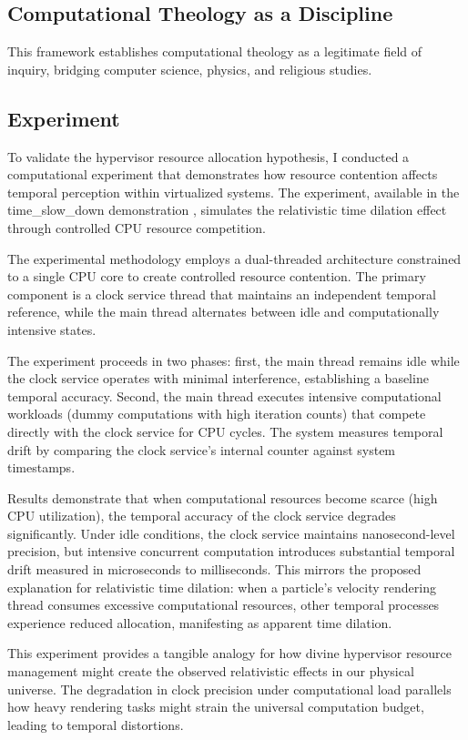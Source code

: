 \documentclass[12pt,a4paper]{article}
\begin{document}
\subsection{Computational Theology as a Discipline}

This framework establishes computational theology as a legitimate field of inquiry, bridging computer science, physics, and religious studies.

\subsection{Experiment}

To validate the hypervisor resource allocation hypothesis, I conducted a computational experiment that demonstrates how resource contention affects temporal perception within virtualized systems. The experiment, available in the time\_slow\_down demonstration \cite{time_slow_demo}, simulates the relativistic time dilation effect through controlled CPU resource competition.

The experimental methodology employs a dual-threaded architecture constrained to a single CPU core to create controlled resource contention. The primary component is a clock service thread that maintains an independent temporal reference, while the main thread alternates between idle and computationally intensive states.

The experiment proceeds in two phases: first, the main thread remains idle while the clock service operates with minimal interference, establishing a baseline temporal accuracy. Second, the main thread executes intensive computational workloads (dummy computations with high iteration counts) that compete directly with the clock service for CPU cycles. The system measures temporal drift by comparing the clock service's internal counter against system timestamps.

Results demonstrate that when computational resources become scarce (high CPU utilization), the temporal accuracy of the clock service degrades significantly. Under idle conditions, the clock service maintains nanosecond-level precision, but intensive concurrent computation introduces substantial temporal drift measured in microseconds to milliseconds. This mirrors the proposed explanation for relativistic time dilation: when a particle's velocity rendering thread consumes excessive computational resources, other temporal processes experience reduced allocation, manifesting as apparent time dilation.

This experiment provides a tangible analogy for how divine hypervisor resource management might create the observed relativistic effects in our physical universe. The degradation in clock precision under computational load parallels how heavy rendering tasks might strain the universal computation budget, leading to temporal distortions.
\end{document}
